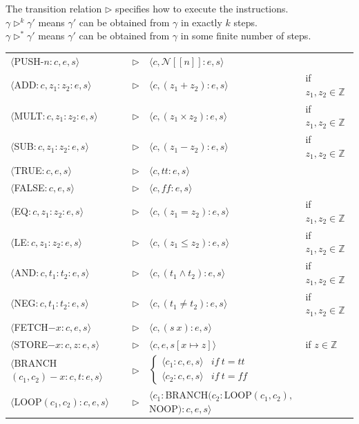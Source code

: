 \documentclass[11pt,a4paper]{article}
\begin{document}
The transition relation $\rhd$ specifies how to execute the instructions.\\
$\gamma\rhd^k\gamma'$ means $\gamma'$ can be obtained from $\gamma$ in exactly $k$ steps.\\
$\gamma\rhd^*\gamma'$ means $\gamma'$ can be obtained from $\gamma$ in some finite number of steps.\\

\begin{tabular}{lcll}
$\langle$PUSH-$n:c,e,s\rangle$&$\rhd$&$\langle c,\mathcal{N}[[n]]:e,s\rangle$\\
$\langle$ADD$:c,z_1:z_2:e,s\rangle$&$\rhd$&$\langle c,(z_1+z_2):e,s\rangle$&if $z_1,z_2\in\mathbb{Z}$\\
$\langle$MULT$:c,z_1:z_2:e,s\rangle$&$\rhd$&$\langle c,(z_1\times z_2):e,s\rangle$&if $z_1,z_2\in\mathbb{Z}$\\
$\langle$SUB$:c,z_1:z_2:e,s\rangle$&$\rhd$&$\langle c,(z_1-z_2):e,s\rangle$&if $z_1,z_2\in\mathbb{Z}$\\
$\langle$TRUE$:c,e,s\rangle$&$\rhd$&$\langle c,tt:e,s\rangle$\\
$\langle$FALSE$:c,e,s\rangle$&$\rhd$&$\langle c,ff:e,s\rangle$\\
$\langle$EQ$:c,z_1:z_2:e,s\rangle$&$\rhd$&$\langle c,(z_1=z_2):e,s\rangle$&if $z_1,z_2\in\mathbb{Z}$\\
$\langle$LE$:c,z_1:z_2:e,s\rangle$&$\rhd$&$\langle c,(z_1\leq z_2):e,s\rangle$&if $z_1,z_2\in\mathbb{Z}$\\
$\langle$AND$:c,t_1:t_2:e,s\rangle$&$\rhd$&$\langle c,(t_1\wedge t_2):e,s\rangle$&if $z_1,z_2\in\mathbb{Z}$\\
$\langle$NEG$:c,t_1:t_2:e,s\rangle$&$\rhd$&$\langle c,(t_1\neq t_2):e,s\rangle$&if $z_1,z_2\in\mathbb{Z}$\\
$\langle$FETCH$-x:c,e,s\rangle$&$\rhd$&$\langle c,(s\ x):e,s\rangle$\\
$\langle$STORE$-x:c,z:e,s\rangle$&$\rhd$&$\langle c,e,s[x\mapsto z]\rangle$&if $z\in\mathbb{Z}$\\
$\langle$BRANCH$(c_1,c_2)-x:c,t:e,s\rangle$&$\rhd$&$\begin{cases}\langle c_1:c,e,s\rangle&if\ t=tt\\\langle c_2:c,e,s\rangle&if\ t=ff\end{cases}$\\
$\langle$LOOP$(c_1,c_2):c,e,s\rangle$&$\rhd$&$\langle c_1:$BRANCH$(c_2:$LOOP$(c_1,c_2),$NOOP$):c,e,s\rangle$
\end{tabular}
\\
\end{document}
